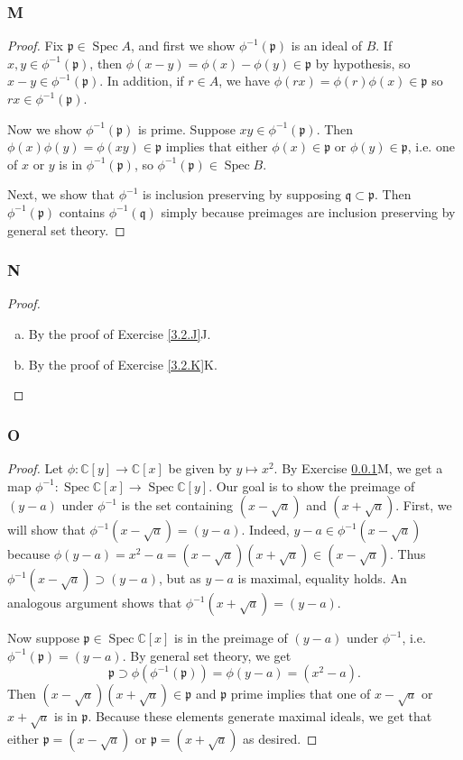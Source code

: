 \documentclass{article}
\newcommand{\C}{\mathbb{C}}
\newcommand{\frkp}{\mathfrak{p}}
\newcommand{\frkq}{\mathfrak{q}}
\DeclareMathOperator{\Spec}{\mathrm{Spec}}
\theoremstyle{definition} %
\begin{document}
\subsubsection{M}\label{3.2.M}
\begin{proof}
    Fix $\frkp \in \Spec A$, and first we show $\phi^{-1}(\frkp)$ is an ideal of $B$. If $x,y\in \phi^{-1}(\frkp)$, then $\phi(x-y)=\phi(x)-\phi(y)\in \frkp$ by hypothesis, so $x-y\in \phi^{-1}(\frkp)$. In addition, if $r\in A$, we have $\phi(rx)=\phi(r)\phi(x)\in \frkp$ so $rx\in \phi^{-1}(\frkp)$.

    Now we show $\phi^{-1}(\frkp)$ is prime. Suppose $xy\in \phi^{-1}(\frkp)$. Then $\phi(x)\phi(y) =\phi(xy)\in \frkp$ implies that either $\phi(x)\in \frkp$ or $\phi(y)\in \frkp$, i.e. one of $x$ or $y$ is in $\phi^{-1}(\frkp)$, so $\phi^{-1}(\frkp)\in \Spec B$.

    Next, we show that $\phi^{-1}$ is inclusion preserving by supposing $\frkq \subset \frkp$. Then $\phi^{-1}(\frkp)$ contains $\phi^{-1}(\frkq)$ simply because preimages are inclusion preserving by general set theory.
\end{proof}
\subsubsection{N}\label{3.2.N}
\begin{proof}
    \begin{enumerate}[(a)]
        \item By the proof of Exercise \ref{3.2.J}J.
        \item By the proof of Exercise \ref{3.2.K}K.
    \end{enumerate}
\end{proof}
\subsubsection{O}\label{3.2.O}
\begin{proof}
    Let $\phi:\C[y]\to \C[x]$ be given by $y\mapsto x^2$. By Exercise \ref{3.2.M}M, we get a map $\phi^{-1}:\Spec \C[x]\to \Spec \C[y]$. Our goal is to show the preimage of $(y-a)$ under $\phi^{-1}$ is the set containing $(x-\sqrt{a})$ and $(x+\sqrt{a})$. First, we will show that $\phi^{-1}(x-\sqrt a)=(y-a)$. Indeed, $y-a\in \phi^{-1}(x-\sqrt a)$ because $\phi(y-a)=x^2-a=(x-\sqrt a)(x+\sqrt a) \in (x-\sqrt a)$. Thus $\phi^{-1}(x-\sqrt a)\supset (y-a)$, but as $y-a$ is maximal, equality holds. An analogous argument shows that $\phi^{-1}(x+\sqrt a)=(y-a)$.

    Now suppose $\frkp \in \Spec \C[x]$ is in the preimage of $(y-a)$ under $\phi^{-1}$, i.e. $\phi^{-1}(\frkp)=(y-a)$. By general set theory, we get
    \[
    \frkp \supset \phi(\phi^{-1}(\frkp)) = \phi(y-a)=(x^2-a).
    \]
    Then $(x-\sqrt a)(x+\sqrt a) \in \frkp$ and $\frkp$ prime implies that one of $x-\sqrt{a}$ or $x+\sqrt a$ is in $\frkp$. Because these elements generate maximal ideals, we get that either $\frkp = (x-\sqrt a)$ or $\frkp = (x+\sqrt a)$ as desired.
\end{proof}
\end{document}

